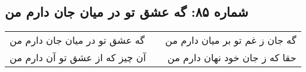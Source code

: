 \begin{center}
\section*{شماره ۸۵: گه عشق تو در میان جان دارم من}
\label{sec:085}
\begin{longtable}{l p{0.5cm} r}
گه عشق تو در میان جان دارم من
&&
گه جان ز غم تو بر میان دارم من
\\
آن چیز که از عشق تو آن دارم من
&&
حقا که ز جان خود نهان دارم من
\\
\end{longtable}
\end{center}
